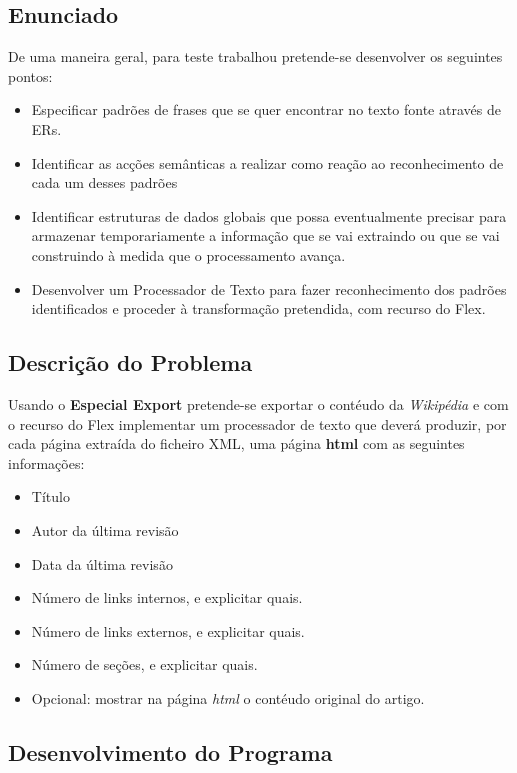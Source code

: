 \documentclass[11pt, a4paper, oneside]{article}
\begin{document}
\subsection{Enunciado}

De uma maneira geral, para teste trabalhou pretende-se desenvolver os seguintes pontos:
\begin{itemize}
\item Especificar padrões de frases que se quer encontrar no texto fonte através de ERs.
\item Identificar as acções semânticas a realizar como reação ao reconhecimento de cada um desses padrões
\item Identificar estruturas de dados globais que possa eventualmente precisar para armazenar temporariamente a informação que se vai extraindo ou que se vai construindo à medida que o processamento avança.
\item Desenvolver um Processador de Texto para fazer reconhecimento dos padrões identificados e proceder à transformação pretendida, com recurso do Flex.
\end{itemize}

\subsection{Descrição do Problema}

Usando o \textbf{Especial Export} pretende-se exportar o contéudo da \textit{Wikipédia} e com o recurso do Flex implementar um processador de texto que deverá produzir, por cada página extraída do ficheiro XML, uma página \textbf{html} com as seguintes informações:

\begin{itemize}
\item Título
\item Autor da última revisão
\item Data da última revisão
\item Número de links internos, e explicitar quais.
\item Número de links externos, e explicitar quais.
\item Número de seções, e explicitar quais.
\item Opcional: mostrar na página \textit{html} o contéudo original do artigo.
\end{itemize}

\newpage

\subsection{Desenvolvimento do Programa}
\end{document}
